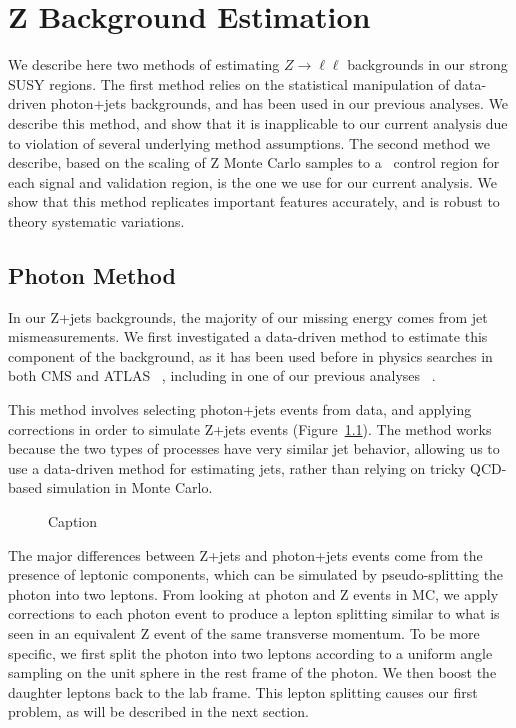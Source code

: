 \chapter{Z Background Estimation}

We describe here two methods of estimating $Z\rightarrow\ell\ell$ backgrounds in our strong SUSY regions. The first method relies on the statistical manipulation of data-driven photon+jets backgrounds, and has been used in our previous analyses. We describe this method, and show that it is inapplicable to our current analysis due to violation of several underlying method assumptions. The second method we describe, based on the scaling of Z Monte Carlo samples to a \mindphijm\ control region for each signal and validation region, is the one we use for our current analysis. We show that this method replicates important features accurately, and is robust to theory systematic variations.

\section{Photon Method}

In our Z+jets backgrounds, the majority of our missing energy comes from jet mismeasurements. We first investigated a data-driven method to estimate this component of the background, as it has been used before in physics searches in both CMS and ATLAS ~\cite{blah}, including in one of our previous analyses ~\cite{blah}.

This method involves selecting photon+jets events from data, and applying corrections in order to simulate Z+jets events (Figure~\ref{fig:photon_to_Z}). The method works because the two types of processes have very similar jet behavior, allowing us to use a data-driven method for estimating jets, rather than relying on tricky QCD-based simulation in Monte Carlo.

\begin{figure}
    \centering
    \caption{Caption}
    \label{fig:photon_to_Z}
\end{figure}

The major differences between Z+jets and photon+jets events come from the presence of leptonic components, which can be simulated by pseudo-splitting the photon into two leptons. From looking at photon and Z events in MC, we apply corrections to each photon event to produce a lepton splitting similar to what is seen in an equivalent Z event of the same transverse momentum. To be more specific, we first split the photon into two leptons according to a uniform angle sampling on the unit sphere in the rest frame of the photon. We then boost the daughter leptons back to the lab frame. This lepton splitting causes our first problem, as will be described in the next section.


